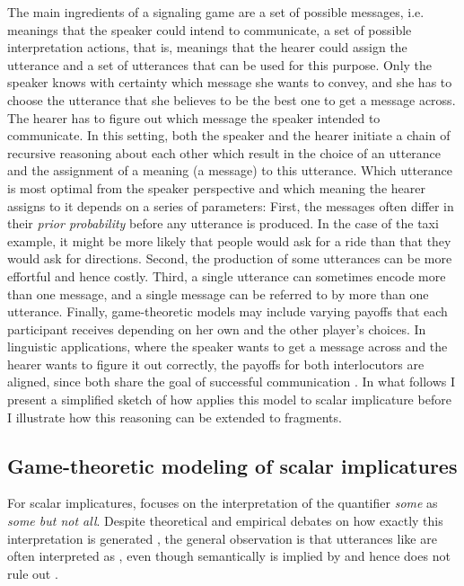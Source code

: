 The main ingredients of a signaling game are a set of possible messages, i.e. meanings that the speaker could intend to communicate, a set of possible interpretation actions, that is, meanings that the hearer could assign the utterance and a set of utterances that can be used for this purpose. Only the speaker knows with certainty which message she wants to convey, and she has to choose the utterance that she believes to be the best one to get a message across. The hearer has to figure out which message the speaker intended to communicate. In this setting, both the speaker and the hearer initiate a chain of recursive reasoning about each other which result in the choice of an utterance and the assignment of a meaning (a message) to this utterance. Which utterance is most optimal from the speaker perspective and which meaning the hearer assigns to it depends on a series of parameters: First, the messages often differ in their \textit{prior probability} before any utterance is produced. In the case of the taxi example, it might be more likely that people would ask for a ride than that they would ask for directions. Second, the production of some utterances can be more effortful and hence costly. Third, a single utterance can sometimes encode more than one message, and a single message can be referred to by more than one utterance. Finally, game-theoretic models may include varying payoffs that each participant receives depending on her own and the other player's choices. In linguistic applications, where the speaker wants to get a message across and the hearer wants to figure it out correctly, the payoffs for both interlocutors are aligned, since both share the goal of successful communication \citep[21]{franke2009}. In what follows I present a simplified sketch of how \citet[59--61]{franke2009} applies this model to scalar implicature before I illustrate how this reasoning can be extended to fragments.

\subsection{Game-theoretic modeling of scalar implicatures}
For scalar implicatures, \citet{franke2009} focuses on the interpretation of the quantifier \textit{some} as \textit{some but not all}. Despite theoretical and empirical debates on how exactly this interpretation is generated \citep[see e.g.][]{levinson1983, levinson2000, sperber.wilson1986, vankuppevelt1996, breheny.etal2006, huang.snedeker2009, grodner.etal2010}, the general observation is that utterances like \Next[a] are often interpreted as \Next[b], even though semantically \Next[a] is implied by and hence does not rule out \Next[c].

